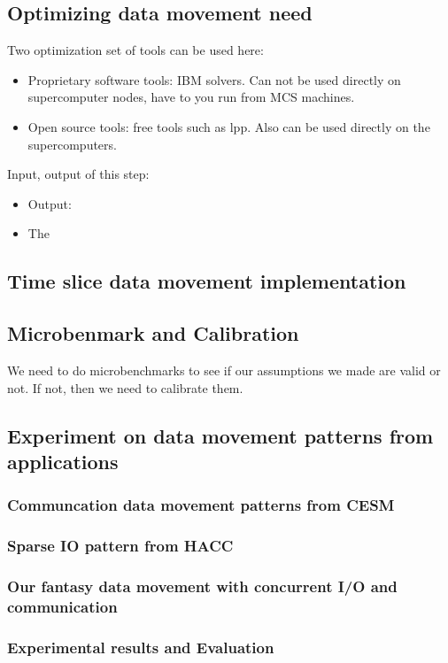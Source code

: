 \documentclass[letter]{article}
\begin{document}
\subsection {Optimizing data movement need}
Two optimization set of tools can be used here:
\begin{itemize}
\item Proprietary software tools: IBM solvers. Can not be used directly on supercomputer nodes, have to you run from MCS machines.
\item Open source tools: free tools such as lpp. Also can be used directly on the supercomputers.
\end{itemize}

Input, output of this step:
\begin{itemize}
\item Output:
\item The
\end{itemize}
 
\subsection{Time slice data movement implementation}

\subsection{Microbenmark and Calibration}

We need to do microbenchmarks to see if our assumptions we made are valid or not. If not, then we need to calibrate them.

\subsection{Experiment on data movement patterns from applications}
\subsubsection{Communcation data movement patterns from CESM}
\subsubsection{Sparse IO pattern from HACC}
\subsubsection{Our fantasy data movement with concurrent I/O and communication}

\subsubsection{Experimental results and Evaluation}
\end{document}
